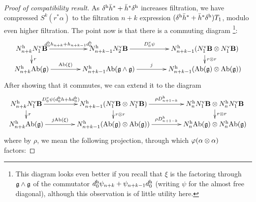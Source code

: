 \documentclass[10pt]{article}
\begin{document}
\begin{Lie Steenrods satisfy the Adem relation}
\begin{proof}[Proof of compatibility result]
As $\delta^\textup{h}\bar{h}^*+ \bar{h}^*\delta^\textup{h}$ increases filtration, we have compressed $S^k(r^*\alpha)$ to the filtration $n+k$ expression $(\delta^\textup{h}\bar{h}^*+ \bar{h}^*\delta^\textup{h})T_1$, modulo even higher filtration.
The point now is that there is a commuting diagram%
\footnote{This diagram looks even better if you recall that $\xi$ is the factoring through $\mathfrak{g}\wedge\mathfrak{g}$ of the commutator ${d_0^\textup{h}\psi_{n+k}+\psi_{n+k-1} d_0^\textup{h}}$ (writing $\psi$ for the almost free diagonal), although this observation is of little utility here.}:
\[\xymatrix@R=4mm@C=15mm{
N_{n+k}^\textup{h}N_1^\textup{v}\textbf{B} \ar[r]^-{d^\textup{h}_0h_{n+k}+h_{n+k-1}d^\textup{h}_0}
\ar[d]^-{r}&%
N_{n+k-1}^\textup{h}N_2^\textup{v}\textbf{B} \ar[r]^-{D^\textup{v}_0\circ\psi}&%
N_{n+k-1}^\textup{h}(N_1^\textup{v}\textbf{B}\otimes N_1^\textup{v}\textbf{B})\ar[d]^-{r\otimes r}
\\%
N_{n+k}^\textup{h}\textup{Ab}(\frakg) \ar[r]^-{\textup{Ab}(\xi)}&%
N_{n+k-1}^\textup{h}\textup{Ab}(\frakg\wedge \frakg) \ar[r]^-{j}&%
N_{n+k-1}^\textup{h}(\textup{Ab}(\frakg)\otimes \textup{Ab}(\frakg))
}\]
After showing that it commutes, we can extend it to the diagram
\[\xymatrix@R=4mm@C=15mm{
N_{n+k}^\textup{h}N_1^\textup{v}\textbf{B} \ar[d]^-{r}
 \ar[r]^-{D^\textup{v}_0\psi (d^\textup{h}_0h+hd^\textup{h}_0)}&%
N_{n+k-1}^\textup{h}(N_1^\textup{v}\textbf{B}\otimes N_1^\textup{v}\textbf{B})\ar[d]^-{r\otimes r}\ar[r]^-{\rho D^\textup{h}_{n+1-k}}
&
N^\textup{h}_nN^\textup{v}_1\textbf{B}\otimes N^\textup{h}_nN^\textup{v}_1\textbf{B}\ar[d]^-{r\otimes r}
\\%
N_{n+k}^\textup{h}\textup{Ab}(\frakg) \ar[r]^-{j\circ\textup{Ab}(\xi)}&%
N_{n+k-1}^\textup{h}(\textup{Ab}(\frakg)\otimes \textup{Ab}(\frakg))
\ar[r]^-{\rho D^\textup{h}_{n+1-k}}
&
N^\textup{h}_n\textup{Ab}(\frakg)\otimes N^\textup{h}_n\textup{Ab}(\frakg)
}\]
where by $\rho$, we mean the following projection, through which $\oldphi(\alpha\otimes\alpha)$ factors:

\end{proof}
\end{Lie Steenrods satisfy the Adem relation}
\end{document}
